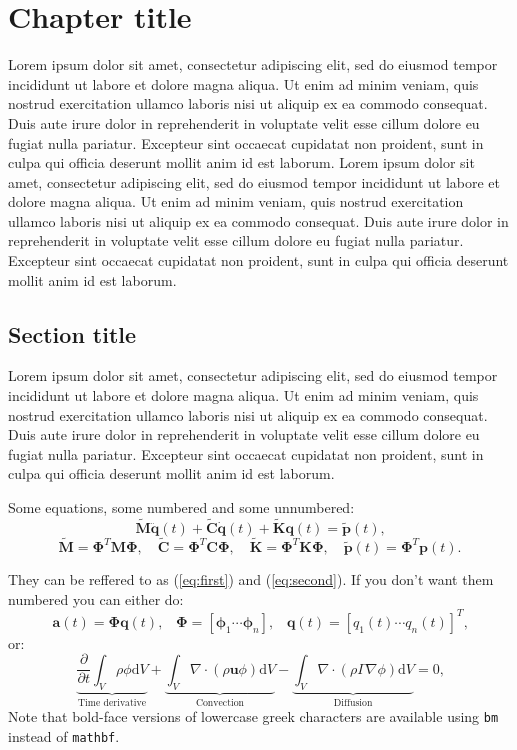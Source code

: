 \chapter{Chapter title}
Lorem ipsum dolor sit amet, consectetur adipiscing elit, sed do eiusmod tempor incididunt ut labore et dolore magna aliqua. Ut enim ad minim veniam, quis nostrud exercitation ullamco laboris nisi ut aliquip ex ea commodo consequat. Duis aute irure dolor in reprehenderit in voluptate velit esse cillum dolore eu fugiat nulla pariatur. Excepteur sint occaecat cupidatat non proident, sunt in culpa qui officia deserunt mollit anim id est laborum. Lorem ipsum dolor sit amet, consectetur adipiscing elit, sed do eiusmod tempor incididunt ut labore et dolore magna aliqua. Ut enim ad minim veniam, quis nostrud exercitation ullamco laboris nisi ut aliquip ex ea commodo consequat. Duis aute irure dolor in reprehenderit in voluptate velit esse cillum dolore eu fugiat nulla pariatur. Excepteur sint occaecat cupidatat non proident, sunt in culpa qui officia deserunt mollit anim id est laborum.


\section{Section title}
Lorem ipsum dolor sit amet, consectetur adipiscing elit, sed do eiusmod tempor incididunt ut labore et dolore magna aliqua. Ut enim ad minim veniam, quis nostrud exercitation ullamco laboris nisi ut aliquip ex ea commodo consequat. Duis aute irure dolor in reprehenderit in voluptate velit esse cillum dolore eu fugiat nulla pariatur. Excepteur sint occaecat cupidatat non proident, sunt in culpa qui officia deserunt mollit anim id est laborum.

Some equations, some numbered and some unnumbered:
\begin{equation}\label{eq:first}
\mathbf{\tilde{M}\ddot{q}}(t) + \mathbf{\tilde{C}\dot{q}}(t) + \mathbf{\tilde{K}q}(t) = \mathbf{\tilde{p}}(t) \text{,}
\end{equation}
\begin{equation}\label{eq:second}
\mathbf{\tilde{M}} = \bm{\Phi}^T\mathbf{M}\bm{\Phi}, \quad
  \mathbf{\tilde{C}} = \bm{\Phi}^T\mathbf{C}\bm{\Phi}, \quad
  \mathbf{\tilde{K}} = \bm{\Phi}^T\mathbf{K}\bm{\Phi}, \quad
  \mathbf{\tilde{p}}(t) = \bm{\Phi}^T\mathbf{p}(t).
\end{equation} 

They can be reffered to as (\ref{eq:first}) and (\ref{eq:second}). If you don't want them numbered you can either do:
\begin{equation*}
  \mathbf{a}(t) = \bm{\Phi}\mathbf{q}(t) \text{,} \quad
  \bm{\Phi} = \left[ \bm{\phi}_1 \dotsb \bm{\phi}_n  \right] \text{,} \quad
  \mathbf{q}(t) =  \left[ q_1(t) \dotsb q_n(t)  \right]^{T} \! \text{,}
\end{equation*}
or:
\[  \underbrace{\frac{\partial}{\partial t} \int_V \rho \phi \text{d}V}_\text{Time derivative} + \underbrace{\int_V \nabla \cdot (\rho \mathbf{u} \phi) \text{d}V}_\text{Convection} - \underbrace{\int_V \nabla \cdot (\rho \Gamma \nabla \phi) \text{d}V}_\text{Diffusion} = 0 \text{,}
\]
Note that bold-face versions of lowercase greek characters are available using \texttt{bm} instead of \texttt{mathbf}.

